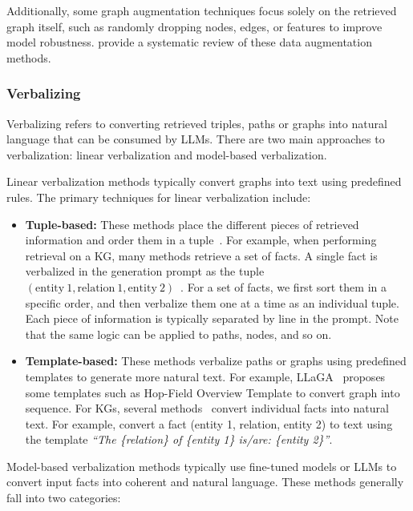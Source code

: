 Additionally, some graph augmentation techniques focus solely on the retrieved graph itself, such as randomly dropping nodes, edges, or features to improve model robustness. \citet{ding2022data} provide a systematic review of these data augmentation methods.


\subsubsection{Verbalizing}
\label{sec:verbalizing}
Verbalizing refers to converting retrieved triples, paths or graphs into natural language that can be consumed by LLMs. There are two main approaches to verbalization: linear verbalization and model-based verbalization.

Linear verbalization methods typically convert graphs into text using predefined rules. The primary techniques for linear verbalization include:

\begin{itemize}[leftmargin=*]
    \item \textbf{Tuple-based:} These methods place the different pieces of retrieved information and order them in a tuple~\cite{baek2023knowledge, oguz2020unik}. For example, when performing retrieval on a KG, many methods retrieve a set of facts. A single fact is verbalized in the generation prompt as the tuple $(\text{entity} \: 1, \text{relation} \: 1, \text{entity} \: 2)$~\cite{niu2024mitigating,  tian2024graph}. For a set of facts, we first sort them in a specific order, and then verbalize them one at a time as an individual tuple. Each piece of information is typically separated by line in the prompt. Note that the same logic can be applied to paths, nodes, and so on.


    \item \textbf{Template-based:} These methods verbalize paths or graphs using predefined templates to generate more natural text. For example, LLaGA~\cite{chen2024llaga} proposes some templates such as Hop-Field Overview Template to convert graph into sequence. For KGs, several methods~\cite{knowledgenavigator, unioqa} convert individual facts into natural text. For example, \citet{knowledgenavigator} convert a fact (entity 1, relation, entity 2) to text using the template {\it ``The \{relation\} of \{entity 1\} is/are: \{entity 2\}''}.
\end{itemize}

Model-based verbalization methods typically use fine-tuned models or LLMs to convert input facts into coherent and natural language. These methods generally fall into two categories:

